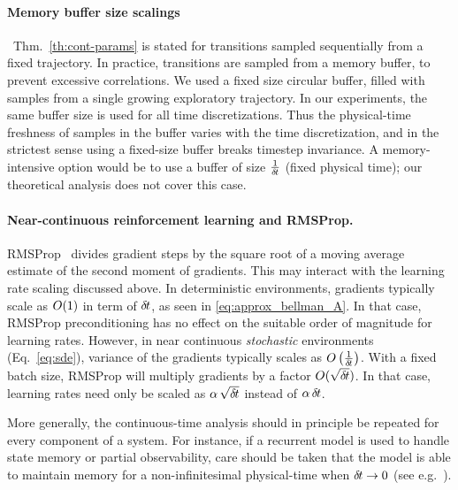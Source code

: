 \paragraph{Memory buffer size scalings}~Thm.~\ref{th:cont-params} is stated for
transitions sampled sequentially from a fixed trajectory. In practice,
transitions are sampled from a memory buffer, to prevent excessive correlations.
We used a fixed size circular buffer, filled
with samples from a single growing exploratory trajectory. In
our experiments, the same buffer size is used for all time discretizations. 
Thus the physical-time freshness of samples in the buffer varies with the
time discretization, and in the strictest sense using a fixed-size buffer
breaks timestep invariance. A memory-intensive option would be to use a
buffer of size $\frac{1}{{\delta\hspace{-.1em}t}}$ (fixed physical time); our theoretical
analysis does not cover this case.

\paragraph{Near-continuous reinforcement learning and RMSProp.}
RMSProp~\cite{rmsprop} divides gradient steps by the square root of a
moving average estimate of the second moment of gradients.
This may interact with the learning rate scaling discussed above. In
deterministic environments, gradients typically scale as $O(1)$ in
term of ${\delta\hspace{-.1em}t}$, as seen in \eqref{eq:approx_bellman_A}.  In that case, RMSProp
preconditioning has no effect on the suitable order of magnitude for learning
rates. However, in near continuous \emph{stochastic} environments (Eq.~\ref{eq:sde}), variance of the gradients typically scales as
$O\left(\frac{1}{{\delta\hspace{-.1em}t}}\right)$. With a fixed batch size,
RMSProp will multiply gradients by a factor $O(\sqrt{{\delta\hspace{-.1em}t}})$. In
that case,
learning rates need only be scaled as $\alpha \,\sqrt{{\delta\hspace{-.1em}t}}$ instead of
$\alpha \,{\delta\hspace{-.1em}t}$.

More generally, the continuous-time analysis should in principle be repeated for every component of  
a system. For instance, if a recurrent model is used to handle state
memory or partial observability, care should be taken that the model is
able to maintain memory for a non-infinitesimal physical-time when
${\delta\hspace{-.1em}t}\to 0$ (see e.g.~\citealt{chronornn}).
